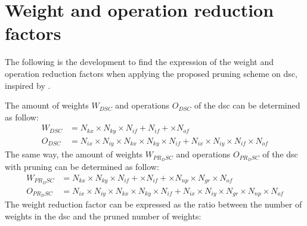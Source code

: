 \chapter{Weight and operation reduction factors} \label{appendix:factor}
The following is the development to find the expression of the weight and operation reduction factors when applying the proposed pruning scheme on \acrshort{dsc}, inspired by \textcite{bai_cnn_2018, liu_fpga-based_2019}.

The amount of weights $W_{DSC}$ and operations $O_{DSC}$ of the \acrshort{dsc} can be determined as follow:
%
\begin{align*}
    W_{DSC} &= N_{kx} \times N_{ky} \times N_{if} + N_{if} + \times N_{of} \\
    O_{DSC} &= N_{ix} \times N_{iy} \times N_{kx} \times N_{ky} \times N_{if} + N_{ix} \times N_{iy} \times N_{if} \times N_{of}
\end{align*}
%
The same way, the amount of weights $W_{PR_DSC}$ and operations $O_{PR_DSC}$ of the \acrshort{dsc} with pruning can be determined as follow:
%
\begin{align*}
    W_{PR_DSC} &= N_{kx} \times N_{ky} \times N_{if} + \times N_{if} + \times N_{np} \times N_{gr} \times N_{of}\\
    O_{PR_DSC} &= N_{ix} \times N_{iy} \times N_{kx} \times N_{ky} \times N_{if} + N_{ix} \times N_{iy} \times N_{gr} \times N_{np} \times N_{of} 
\end{align*}
%
The weight reduction factor can be expressed as the ratio between the number of weights in the \acrshort{dsc} and the pruned number of weights:

